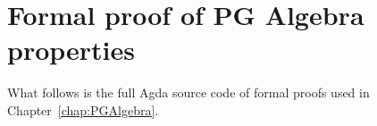
















\renewcommand{\chaptername}{Appendix}
\setcounter{chapter}{0}
\renewcommand\thechapter{\Alph{chapter}}

\chapter{Formal proof of PG Algebra properties}

What follows is the full Agda source code of formal proofs used in Chapter~\ref{chap:PGAlgebra}.

\renewcommand \textlambda {\ensuremath{\lambda}}

\setlength{\mathindent}{0.0in}


